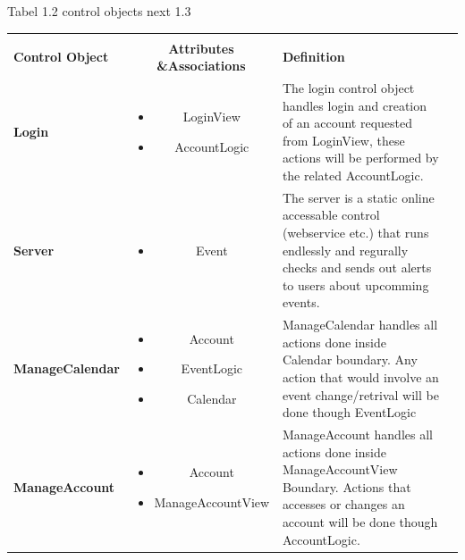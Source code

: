 \documentclass{article}
\begin{document}
		\pagebreak{}

\hfill \break Tabel 1.2 control objects next 1.3\\
\begin{tabular}{l c l @{} l}
	\multicolumn{2}{c}{} \\
	\textbf{Control Object}&\textbf{Attributes \&Associations}&\textbf{Definition}\\
	\hline
	\textbf{Login}&\parbox{.45\textwidth}{
            \begin{itemize}
                \item LoginView
                \item AccountLogic 
            \end{itemize} }
&\parbox{.3\textwidth}{
            The login control object handles login and creation of an account requested from LoginView, these actions will be performed by the related AccountLogic. } \\
	\hline
	\textbf{Server}&\parbox{.45\textwidth}{
            \begin{itemize}
                \item Event
            \end{itemize} }
&\parbox{.3\textwidth}{
            The server is a static online accessable control (webservice etc.) that runs endlessly and regurally checks and sends out alerts to users about upcomming events. } \\
	\hline
	\textbf{ManageCalendar}&\parbox{.45\textwidth}{
            \begin{itemize}
                \item Account
                \item EventLogic
                \item Calendar
            \end{itemize} }
&\parbox{.3\textwidth}{
           ManageCalendar handles all actions done inside Calendar boundary. Any action that would involve an event change/retrival will be done though EventLogic  } \\
	\hline
	\textbf{ManageAccount}&\parbox{.45\textwidth}{
            \begin{itemize}
                \item Account
                \item ManageAccountView
            \end{itemize} }
&\parbox{.3\textwidth}{
            ManageAccount handles all actions done inside ManageAccountView Boundary. Actions that accesses or changes an account will be done though AccountLogic.  } \\



\end{tabular}
	\pagebreak{}
\end{document}
